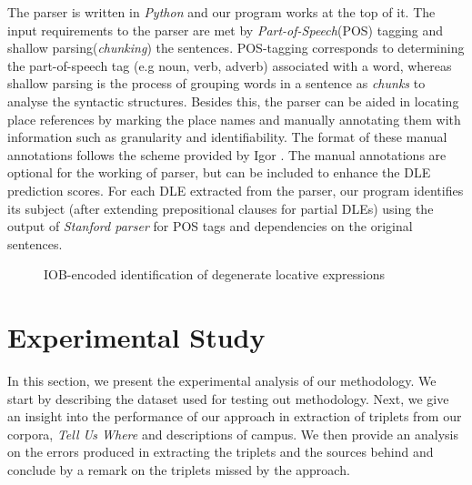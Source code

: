 \documentclass{acm_proc_article-sp}
\begin{document}
The parser is written in \textit{Python} and our program works at the top of it. The input requirements to the parser are met by \textit{Part-of-Speech}(POS) tagging and shallow parsing(\textit{chunking}) the sentences. POS-tagging corresponds to determining the part-of-speech tag (e.g noun, verb, adverb) associated with a word, whereas shallow parsing is the process of grouping words in a sentence as \textit{chunks} to analyse the syntactic structures. Besides this, the parser can be aided in locating place references by marking the place names and manually annotating them with information such as granularity and identifiability. The format of these manual annotations follows the scheme provided by Igor \cite{igor:annotations}. The manual annotations are optional for the working of parser, but can be included to enhance the DLE prediction scores. For each DLE extracted from the parser, our program identifies its subject (after extending prepositional clauses for partial DLEs) using the output of \textit{Stanford parser} \cite{klein:accurate} for POS tags and dependencies on the original sentences. 
\begin{figure}
\centering
\caption{IOB-encoded identification of degenerate locative expressions}
\label{fig:IOB}
\end{figure}
\section{Experimental Study}
\label{sec:experimentalstudy}
In this section, we present the experimental analysis of our methodology. We start by describing the dataset used for testing out methodology. Next, we give an insight into the performance of our approach in extraction of triplets from our corpora, \textit{Tell Us Where} and descriptions of campus.  We then provide an analysis on the errors produced in extracting the triplets and the sources behind and conclude by a remark on the triplets missed by the approach.  
\end{document}

